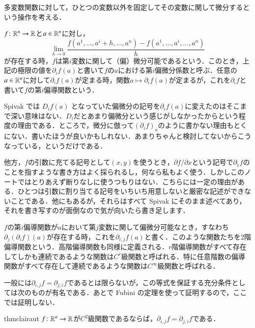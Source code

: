 多変数関数に対して，ひとつの変数以外を固定してその変数に関して微分するという操作を考える．

\begin{defi}
$f \colon \mathbb{R}^n \to \mathbb{R}$と$a \in \mathbb{R}^n$に対し，
\begin{equation}
\lim_{h \to 0} \frac{f(a^1, \dots, a^i+h, \dots, a^n) - f(a^1 , \dots, a^i, \dots, a^n)}{h}
\end{equation}が存在する時，$f$は第$i$変数に関して（偏）微分可能であるという．このとき，上記の極限の値を$\partial_i f (a)$と書いて$f$の$a$における第$i$偏微分係数と呼ぶ．任意の$a \in \mathbb{R}^n$に対して$\partial_i f(a)$が定まる時，関数$a \mapsto \partial_i f(a)$が定まるが，これを$\partial_i f$と書いて$f$の第$i$偏導関数という．
\end{defi}

\begin{dig}
Spivak では $D_i f(a)$ となっていた偏微分の記号を$\partial_i f(a)$に変えたのはそこまで深い意味はない．$D_i$だとあまり偏微分という感じがしなかったからという程度の理由である．ところで，微分に倣って$(\partial_i f)_a$のように書かない理由もとくにない．書いたほうが良いかもしれない．あまりちゃんと検討してないからこうなっている，というだけである．

他方，$f$の引数に充てる記号として$(x,y)$を使うとき，$\partial f/\partial x$という記号で$\partial_1 f$のことを指すような書き方はよく採られるし，何なら私もよく使う．しかしこのノートではとりあえず断りなしに使うつもりはない．こちらには一定の理由がある．ひとつは引数に割り当てる記号をいちいち用意しないと厳密な記述ができないことである．他にもあるが，それらはすべて Spivak にそのまま述べてあり，それを書き写すのが面倒なので気が向いたら書き足します．
\end{dig}

\begin{defi}
$f$の第$i$偏導関数が$a$において第$j$変数に関して偏微分可能なとき，すなわち$\partial_j (\partial_i f)(a)$が存在する時，これを$\partial_{i,j}f(a)$と書く．このような関数たちを2階偏導関数という．高階偏導関数も同様に定義される．$r$階偏導関数がすべて存在してしかも連続であるような関数は$C^r$級関数と呼ばれる．特に任意階数の偏導関数がすべて存在して連続であるような関数は$C^\infty$級関数と呼ばれる．
\end{defi}

一般には$\partial_{i,j} f = \partial_{j,i} f$であるとは限らないが，この等式を保証する充分条件としては次のものが有名である．あとで Fubini の定理を使って証明するので，ここでは証明しない．

\begin{restatable}{thm}{clairaut}\label{clairaut}
$f \colon \mathbb{R}^n \to \mathbb{R}$が$C^2$級関数であるならば，$\partial_{i,j} f = \partial_{j,i} f$である．
\end{restatable}

